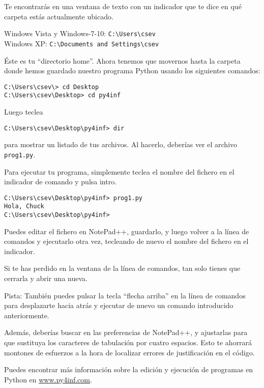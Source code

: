 Te encontrarás en una ventana de texto con un indicador que
te dice en qué carpeta estás actualmente ubicado.

Windows Vista y Windows-7-10: {\tt C:{\textbackslash}Users{\textbackslash}csev}\\
Windows XP: {\tt C:{\textbackslash}Documents and Settings{\textbackslash}csev}

Éste es tu ``directorio home''. Ahora tenemos que movernos hasta
la carpeta donde hemos guardado nuestro programa Python usando
los siguientes comandos:

\beforeverb
\begin{verbatim}
C:\Users\csev\> cd Desktop
C:\Users\csev\Desktop> cd py4inf
\end{verbatim}
\afterverb
%
Luego teclea

\beforeverb
\begin{verbatim}
C:\Users\csev\Desktop\py4inf> dir 
\end{verbatim}
\afterverb
%
para mostrar un listado de tus archivos. Al hacerlo, 
deberías ver el archivo {\tt prog1.py}.

Para ejecutar tu programa, simplemente teclea el nombre del fichero en
el indicador de comando y pulsa intro.

\beforeverb
\begin{verbatim}
C:\Users\csev\Desktop\py4inf> prog1.py
Hola, Chuck
C:\Users\csev\Desktop\py4inf> 
\end{verbatim}
\afterverb
%
Puedes editar el fichero en NotePad++, guardarlo, y luego volver
a la línea de comandos y ejecutarlo otra vez, tecleando de nuevo
el nombre del fichero en el indicador.

Si te has perdido en la ventana de la línea de comandos, tan solo tienes
que cerrarla y abrir una nueva.

Pista: También puedes pulsar la tecla ``flecha arriba'' en la línea de comandos para
desplazarte hacia atrás y ejecutar de nuevo un comando introducido anteriormente.

Además, deberías buscar en las preferencias de NotePad++, y ajustarlas para
que sustituya los caracteres de tabulación por cuatro espacios. Esto te ahorrará
montones de esfuerzos a la hora de localizar errores de justificación en el código.

Puedes encontrar más información sobre la edición y ejecución de
programas en Python en \url{www.py4inf.com}.

